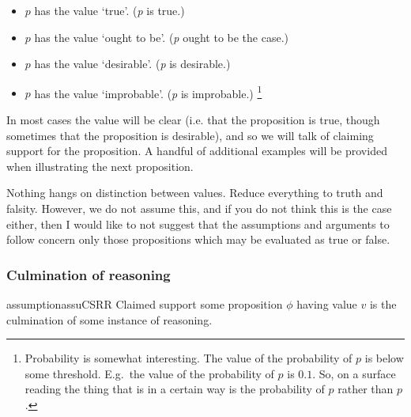 \begin{note}
    \begin{itemize}
  \item \(p\) has the value `true'. \hfill (\emph{p} is true.)
  \item \(p\) has the value `ought to be'. \hfill (\emph{p} ought to be the case.)
  \item \(p\) has the value `desirable'. \hfill (\emph{p} is desirable.)
  \item \(p\) has the value `improbable'. \hfill (\emph{p} is improbable.)\nolinebreak
    \footnote{
      Probability is somewhat interesting.
      The value of the probability of \(p\) is below some threshold.
      E.g.\ the value of the probability of \(p\) is \(0.1\).
      So, on a surface reading the thing that is in a certain way is the probability of \(p\) rather than \(p\).
    }
  \end{itemize}
\end{note}


\begin{note}
In most cases the value will be clear (i.e. that the proposition is true, though sometimes that the proposition is desirable), and so we will talk of claiming support for the proposition.
  A handful of additional examples will be provided when illustrating the next proposition.
\end{note}


\begin{note}
  Nothing hangs on distinction between values.
  Reduce everything to truth and falsity.
  However, we do not assume this, and if you do not think this is the case either, then I would like to not suggest that the assumptions and arguments to follow concern only those propositions which may be evaluated as true or false.
\end{note}

\subsubsection{Culmination of reasoning}

\begin{note}
  \begin{restatable}{assumption}{assuCSRR}\label{assu:CS-culmination-of-R}
    Claimed support some proposition \(\phi\) having value \(v\) is the culmination of some instance of reasoning.
  \end{restatable}
\end{note}

